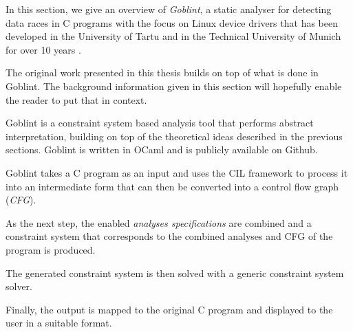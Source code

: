 \documentclass[..thesis.tex]{subfiles}
\begin{document}

In this section, we give an overview  of \textit{Goblint}, a static analyser for detecting data races in C programs with the focus on Linux device drivers that has been developed in the University of Tartu and in the Technical University of Munich for over 10 years \cite{_goblint_????,apinis_frameworks_2014,vojdanivesal_static_2010}.




The original work presented in this thesis builds on top of what is done in Goblint. The background information given in this section will hopefully enable the reader to put that in context.


Goblint is a constraint system based analysis tool that performs abstract interpretation, building on top of the theoretical ideas described in the previous sections. Goblint is written in OCaml and is publicly available on Github.

Goblint takes a C program as an input and uses the CIL framework to process it into an intermediate form that can then be converted into a control flow graph (\textit{CFG}). 


As the next step, the enabled \textit{analyses specifications} are combined and a constraint system that corresponds to the combined analyses and CFG of the program is produced.

The generated constraint system is then solved with a generic constraint system solver. 

Finally, the output is mapped to the original C program and displayed to the user in a suitable format.
\end{document}
